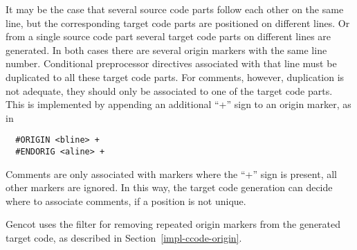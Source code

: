 It may be the case that several source code parts follow each other on the same line, but the corresponding target code
parts are positioned on different lines. Or from a single source code part several target code parts on different lines 
are generated. In both cases there are several origin markers with the same line number. Conditional preprocessor directives
associated with that line must be duplicated to all these target code parts. For comments, however, duplication is not
adequate, they should only be associated to one of the target code parts. This is implemented by appending an additional 
``+'' sign to an origin marker, as in 
\begin{verbatim}
  #ORIGIN <bline> +
  #ENDORIG <aline> +
\end{verbatim}
Comments are only associated with markers where the ``+'' sign is present, all other markers are ignored. In this way,
the target code generation can decide where to associate comments, if a position is not unique.

Gencot uses the filter  for removing repeated origin markers from the generated target code, as 
described in Section~\ref{impl-ccode-origin}.
